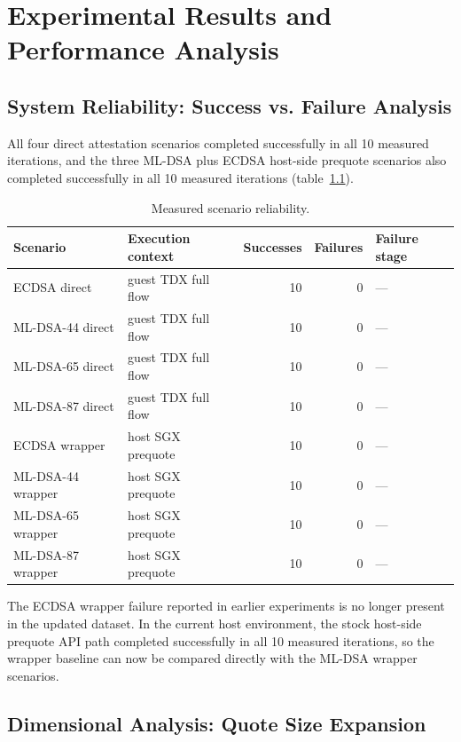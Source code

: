 \chapter{Experimental Results and Performance Analysis}
\label{chap:experimental-results}

\section{System Reliability: Success vs. Failure Analysis}

All four direct attestation scenarios completed successfully in all 10 measured
iterations, and the three ML-DSA plus ECDSA host-side prequote scenarios also
completed successfully in all 10 measured iterations
(table~\ref{tab:reliability-summary}).

\begin{table}[t]
\centering
\small
\caption{Measured scenario reliability.}
\label{tab:reliability-summary}
\begin{tabular}{|l|l|r|r|l|}
\hline
Scenario & Execution context & Successes & Failures & Failure stage \\
\hline
ECDSA direct & guest TDX full flow & 10 & 0 & --- \\
ML-DSA-44 direct & guest TDX full flow & 10 & 0 & --- \\
ML-DSA-65 direct & guest TDX full flow & 10 & 0 & --- \\
ML-DSA-87 direct & guest TDX full flow & 10 & 0 & --- \\
ECDSA wrapper & host SGX prequote & 10 & 0 & --- \\
ML-DSA-44 wrapper & host SGX prequote & 10 & 0 & --- \\
ML-DSA-65 wrapper & host SGX prequote & 10 & 0 & --- \\
ML-DSA-87 wrapper & host SGX prequote & 10 & 0 & --- \\
\hline
\end{tabular}
\end{table}

The ECDSA wrapper failure reported in earlier experiments is no longer present
in the updated dataset. In the current host environment, the stock host-side
prequote API path completed successfully in all 10 measured iterations, so the
wrapper baseline can now be compared directly with the ML-DSA wrapper
scenarios.

\section{Dimensional Analysis: Quote Size Expansion}


